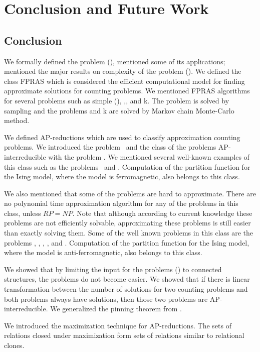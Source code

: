 \chapter{Conclusion and Future Work}
\section{Conclusion}
We formally defined the problem \ccsp(\mrelset), mentioned some of its applications; mentioned the 
major results on complexity of the problem \ccsp(\mrelset). We defined the
class FPRAS which is considered the efficient computational model for finding approximate solutions
for counting problems.
We mentioned FPRAS algorithms for several problems such as simple \ccsp(\mrelset),
,, and k.
The problem  is solved by sampling and the problems  and 
k are solved by Markov chain Monte-Carlo method. 

We defined AP-reductions which are used to classify approximation counting problems.
We introduced the problem \cbis\ and the class of the problems AP-interreducible with
the problem \cbis\@. We mentioned several well-known examples of this class such as
the  problems \cdsp\ and \@. Computation of the partition function for 
the Ising model, where the model is ferromagnetic, also belongs to this class.

We also mentioned that some of the problems are hard to approximate. There are
no polynomial time approximation algorithm for any of the problems in this class, unless \(RP=NP\)\@.
Note that although according to current knowledge these problems are not efficiently solvable,
approximating these problems is still easier than exactly solving them.
Some of the well known problems in this 
class are the problems \cdsat, \ctsat, \csat, \cisp, and \ctcol\@. Computation
of the partition function for 
the Ising model, where the model is anti-ferromagnetic, also belongs to this class.

We showed that by limiting the input for the problems \ccsp(\mrelset) to connected structures,
the problems do not become easier. We showed that if there is linear transformation 
between the number of solutions for two counting problems and 
both problems always have solutions, then those two problems are AP-interreducible.
We generalized the pinning theorem from \cite{Trichotomy}\@. 

We introduced the maximization technique for AP-reductions. The sets of relations closed
under maximization form sets of relations similar to relational clones.

